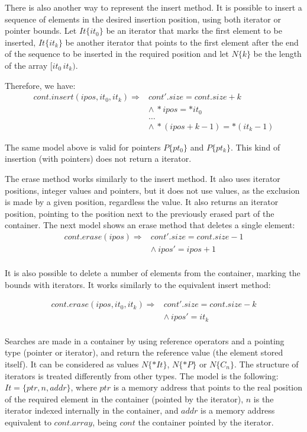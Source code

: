 \documentclass[a4paper]{llncs}
\begin{document}
There is also another way to represent the insert method. 
It is possible to insert a sequence of elements in the desired 
insertion position, using both iterator or pointer bounds. 
Let $It\{it_0\}$ be an iterator that marks the first element 
to be inserted, $It\{it_k\}$ be another iterator that 
points to the first element after the end of the sequence to be inserted 
in the required position and let $N\{k\}$ be the length of the array $[it_0\, it_k)$. 

Therefore, we have:\\

\[\begin{array}{ll}
cont.insert(ipos, it_0, it_k) \Longrightarrow & cont'.size = cont.size + k\\
  & \wedge \: *ipos = *it_0 \\
  & \ldots \\
  & \wedge \: *(ipos + k - 1) = *(it_k - 1)
\end{array}\]

The same model above is valid for pointers $P\{pt_0\}$ and $P\{pt_k\}$. 
This kind of insertion (with pointers) does not return a iterator.

The erase method works similarly to the insert method. It also uses iterator 
positions, integer values and pointers, but it does not use values, as the exclusion 
is made by a given position, regardless the value. It also returns an iterator position, 
pointing to the position next to the previously erased part of the container. 
The next model shows an erase method that deletes a single element:
%
\[\begin{array}{ll}
\label{erase1-model}
cont.erase (ipos) \Longrightarrow & cont'.size = cont.size - 1\\
  & \wedge \: ipos' = ipos + 1 \\
\end{array}\]

It is also possible to delete a number of elements from the container, 
marking the bounds with iterators. It works similarly to the equivalent 
insert method:

\[\begin{array}{ll}
\label{erase2-model}
cont.erase (ipos, it_0, it_k) \Longrightarrow & 	cont'.size = cont.size - k\\
  & \wedge \:	ipos' = it_k \\
\end{array}\]

Searches are made in a container by using reference operators 
and a pointing type (pointer or iterator), and return the reference 
value (the element stored itself). It can be considered as values 
$N\{*It\}$, $N\{*P\}$ or $N\{C_n\}$.	The structure of iterators 
is treated differently from other types. The model is the following:
$It = \{ ptr, n, addr\}$,
where $ptr$ is a memory address that points to the 
real position of the required element in the container 
(pointed by the iterator), $n$ is the iterator indexed 
internally in the container, and $addr$ is a memory 
address equivalent to $cont.array$, being $cont$ the container 
pointed by the iterator.
\end{document}
